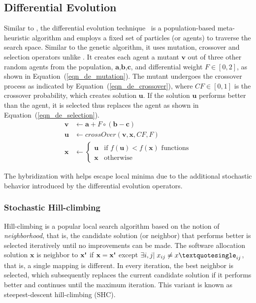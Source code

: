 \subsection{Differential Evolution}
Similar to \pso{}, the differential evolution technique~\cite{Storn1997DifferentialSpaces,Das2016RecentSurvey} is a population-based meta-heuristic algorithm and employs a fixed set of particles (or agents) to traverse the search space. Similar to the genetic algorithm, it uses mutation, crossover and selection operators unlike \pso{}. It creates each agent \ttx a mutant $\textbf{v}$ out of three other random agents from the population, $\textbf{a,b,c}$, and differential weight $F\in[0,2]$, as shown in Equation~(\ref{eqn_de_mutation}). The mutant undergoes the crossover process as indicated by Equation~(\ref{eqn_de_crossover}), where $CF\in[0,1]$ is the crossover probability, which creates solution $\textbf{u}$. If the solution $\textbf{u}$ performs better than the agent, it is selected thus replaces the agent \ttx as shown in Equation~(\ref{eqn_de_selection}).
\begin{align}
    \label{eqn_de_mutation}
    \textbf{v} & \leftarrow   \textbf{a} + F\circ(\textbf{b}-\textbf{c})\\
    \label{eqn_de_crossover}
    \textbf{u}&\leftarrow crossOver(\textbf{v},\textbf{x},CF,F)\\
    \label{eqn_de_selection}
    \textbf{x} &\leftarrow 
    \begin{cases}
    \textbf{u} & \mbox{if } f(\textbf{u}) < f(\textbf{x})\mbox{ functions}\\
    \textbf{x} & \mbox{otherwise }
    \end{cases}
\end{align}

The hybridization with \de{} helps \pso{} escape local minima due to the additional stochastic behavior introduced by the differential evolution operators.

\subsubsection{Stochastic Hill-climbing \pso}
Hill-climbing is a popular local search algorithm based on the notion of \textit{neighborhood}, that is, the candidate solution (or neighbor) that performs better is selected iteratively until no improvements can be made. The software allocation solution $\textbf{x}$ is neighbor to $\textbf{x\textquotesingle}$ if $\textbf{x}=\textbf{x\textquotesingle}$ except $\exists i,j|\;x_{ij}\neq x\textquotesingle_{ij}$, that is, a single mapping is different. In every iteration, the best neighbor is selected, which subsequently replaces the current candidate solution if it performs better and continues until the maximum iteration. This variant is known as steepest-descent hill-climbing (SHC).

